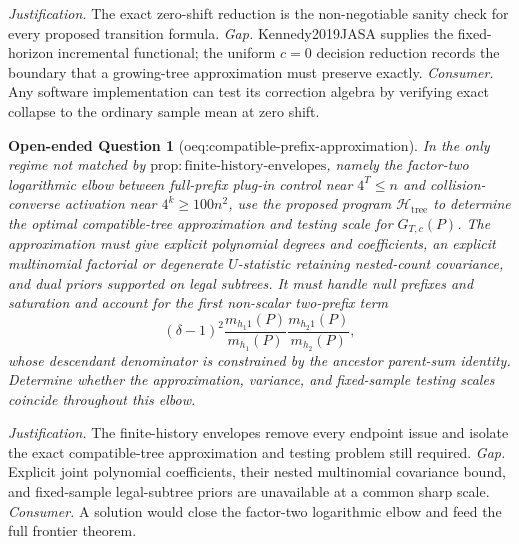 \documentclass{article}
\newtheorem{openendedquestion}{Open-ended Question}
\begin{document}
\par\smallskip\noindent \textit{Justification.} The exact zero-shift reduction is the non-negotiable sanity check for every proposed transition formula. \textit{Gap.} Kennedy2019JASA supplies the fixed-horizon incremental functional; the uniform \(c=0\) decision reduction records the boundary that a growing-tree approximation must preserve exactly. \textit{Consumer.} Any software implementation can test its correction algebra by verifying exact collapse to the ordinary sample mean at zero shift.

\begin{openendedquestion}[oeq:compatible-prefix-approximation]\label{oeq:compatible-prefix-approximation}
In the only regime not matched by \(\mathrm{prop:finite\text{-}history\text{-}envelopes}\), namely the factor-two logarithmic elbow between full-prefix plug-in control near \(4^T\leq n\) and collision-converse activation near \(4^k\geq100n^2\), use the proposed program \(\mathscr H_{\mathrm{tree}}\) to determine the optimal compatible-tree approximation and testing scale for \(G_{T,c}(P)\).  The approximation must give explicit polynomial degrees and coefficients, an explicit multinomial factorial or degenerate \(U\)-statistic retaining nested-count covariance, and dual priors supported on legal subtrees.  It must handle null prefixes and saturation and account for the first non-scalar two-prefix term
\[
(\delta-1)^2\frac{m_{h_1 1}(P)}{m_{h_1}(P)}
\frac{m_{h_2 1}(P)}{m_{h_2}(P)},
\]
whose descendant denominator is constrained by the ancestor parent-sum identity.  Determine whether the approximation, variance, and fixed-sample testing scales coincide throughout this elbow.
\end{openendedquestion}
\par\smallskip\noindent \textit{Justification.} The finite-history envelopes remove every endpoint issue and isolate the exact compatible-tree approximation and testing problem still required. \textit{Gap.} Explicit joint polynomial coefficients, their nested multinomial covariance bound, and fixed-sample legal-subtree priors are unavailable at a common sharp scale. \textit{Consumer.} A solution would close the factor-two logarithmic elbow and feed the full frontier theorem.
\end{document}
